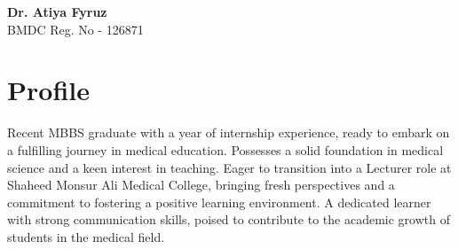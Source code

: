 \documentclass[a4paper,12pt]{article}
\begin{document}
\begin{minipage}[t]{\textwidth}
    \raggedright
    {\Huge\bfseries\color{black}Dr. Atiya Fyruz}\\
    \large{BMDC Reg. No - 126871}
    \vspace{1.5cm}    
\end{minipage}
\begin{minipage}[t][6.4cm]{\textwidth}
\section*{Profile}
  Recent MBBS graduate with a year of internship experience, ready to embark on a fulfilling journey in medical education. 
  Possesses a solid foundation in medical science and a keen interest in teaching. 
  Eager to transition into a Lecturer role at Shaheed Monsur Ali Medical College, bringing fresh perspectives and a commitment to fostering a positive learning environment. 
  A dedicated learner with strong communication skills, poised to contribute to the academic growth of students in the medical field.
\end{minipage}
\end{document}
